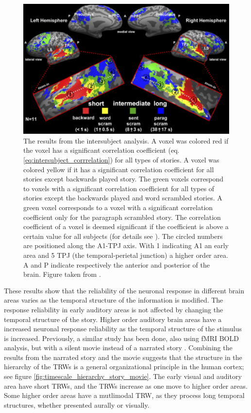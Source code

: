 \begin{figure}[!ht]
\centering
\includegraphics[scale=0.38]{hierarchy_figures/temporal_hierarchy}
\caption{
The results from the intersubject analysis. 
A voxel was colored red if the voxel has a significant correlation coefficient (eq. \ref{eq:intersubject_corrrelation}) for all types of stories.
A voxel was colored yellow if it has a significant correlation coefficient for all stories except backwards played story.
The green voxels correspond to voxels with a significant correlation coefficient for all types of stories except the backwards played and word scrambled stories.
A green voxel corresponds to a voxel with a significant correlation coefficient only for the paragraph scrambled story.
The correlation coefficient of a voxel is deemed significant if the coefficient is above a certain value for all subjects (for details see \cite{lerner2011topographic}).
The circled numbers are positioned along the A1-TPJ axis. With 1 indicating A1 an early area and 5 TPJ (the temporal-perietal junction) a higher order area.
A and P indicate respectively the anterior and posterior of the brain.
Figure taken from \cite{lerner2011topographic}. }
\label{fig:timescale_hierarchy}
\end{figure}

These results show that the reliability of the neuronal response in different brain areas varies as the temporal structure of the information is modified.
The response reliability in early auditory areas is not affected by changing the temporal structure of the story.
Higher order auditory brain areas have a increased neuronal response reliability as the temporal structure of the stimulus is increased.
Previously, a similar study has been done, also using fMRI BOLD analysis, but with a silent movie instead of a narrated story \cite{hasson2008hierarchy}.
Combining the results from the narrated story and the movie suggests that the structure in the hierarchy of the TRWs is a general organizational principle in the human cortex; see figure \ref{fig:timescale_hierarchy_story_movie}.
The early visual and auditory area have short TRWs, and the TRWs increase as one move to higher order areas. Some higher order areas  have a  mutlimodal TRW, as they process long temporal structures, whether presented aurally or visually.


